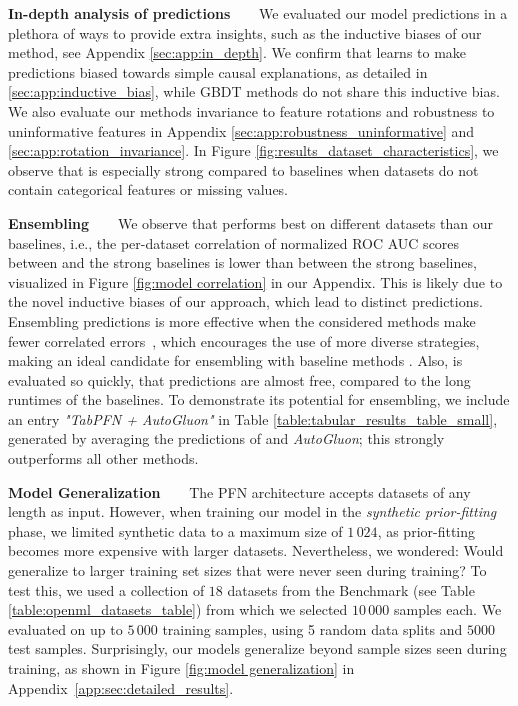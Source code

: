 \documentclass{article}
\newcommand{\slimparagraph}[1]{\textbf{#1~~~}}
\begin{document}
\slimparagraph{In-depth analysis of \methodname{} predictions} We evaluated our model predictions in a plethora of ways to provide extra insights, such as the inductive biases of our method, see Appendix \ref{sec:app:in_depth}. We confirm that \methodname{} learns to make predictions biased towards simple causal explanations, as detailed in \ref{sec:app:inductive_bias}, while GBDT methods do not share this inductive bias.
We also evaluate our method\textquotesingle{}s invariance to feature rotations and robustness to uninformative features in Appendix \ref{sec:app:robustness_uninformative} and \ref{sec:app:rotation_invariance}.
In Figure \ref{fig:results_dataset_characteristics}, we observe that \methodname{} is especially strong compared to baselines when datasets do not contain categorical features or missing values.

\slimparagraph{Ensembling} We observe that \methodname{} performs best on different datasets than our baselines, i.e., the per-dataset correlation of normalized ROC AUC scores between \methodname{} and the strong baselines is lower than between the strong baselines, visualized in Figure \ref{fig:model correlation} in our Appendix.
This is likely due to the novel inductive biases of our approach, which lead to distinct predictions.
Ensembling predictions is more effective when the considered methods make fewer correlated errors~\citep{breimann-mlj01a}, which encourages the use of more diverse strategies, making \methodname{} an ideal candidate for ensembling with baseline methods \citep{ensemblediversity}.
Also, \methodname{} is evaluated so quickly, that predictions are almost free, compared to the long runtimes of the baselines. To demonstrate its potential for ensembling, we include an entry \textit{"TabPFN + AutoGluon"} in Table \ref{table:tabular_results_table_small}, generated by averaging the predictions of \methodname{} and \textit{AutoGluon}; this strongly outperforms all other methods.

\slimparagraph{Model Generalization}
The PFN architecture accepts datasets of any length as input. However, when training our model in the \textit{synthetic prior-fitting} phase, we limited synthetic data to a maximum size of $1\,024$, as prior-fitting becomes more expensive with larger datasets.
Nevertheless, we wondered: Would \methodname{} generalize to larger training set sizes that were never seen during training?
To test this, we used a collection of $18$ datasets from the \openmlautoml{} Benchmark (see Table \ref{table:openml_datasets_table}) from which we selected $10\,000$ samples each. We evaluated \methodname{} on up to $5\,000$ training samples, using 5 random data splits and $5000$ test samples. %
Surprisingly, our models generalize beyond sample sizes seen during training, as shown in Figure \ref{fig:model generalization} in Appendix~\ref{app:sec:detailed_results}.
\end{document}
